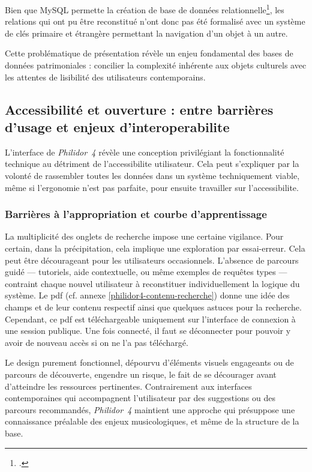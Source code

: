 Bien que MySQL permette la création de base de données relationnelle\footcite{duboisMySQLGuideOfficiel2004}, les relations qui ont pu être reconstitué n'ont donc pas été formalisé avec un système de clés primaire et étrangère permettant la navigation d'un objet à un autre.

Cette problématique de présentation révèle un enjeu fondamental des bases de données patrimoniales : concilier la complexité inhérente aux objets culturels avec les attentes de lisibilité des utilisateurs contemporains.

\subsection{Accessibilité et ouverture : entre barrières d'usage et enjeux d'\gls{interoperabilite}} \label{accessibilite_et_ouverture}

L'interface de \textit{Philidor~4} révèle une conception privilégiant la fonctionnalité technique au détriment de l'\gls{accessibilite} utilisateur. Cela peut s'expliquer par la volonté de rassembler toutes les données dans un système techniquement viable, même si l'ergonomie n'est pas parfaite, pour ensuite travailler sur l'\gls{accessibilite}.

\subsubsection{Barrières à l'appropriation et courbe d'apprentissage}

La multiplicité des onglets de recherche impose une certaine vigilance. Pour certain, dans la précipitation, cela implique une exploration par essai-erreur. Cela peut être décourageant pour les utilisateurs occasionnels. L'absence de parcours guidé --- tutoriels, aide contextuelle, ou même exemples de requêtes types --- contraint chaque nouvel utilisateur à reconstituer individuellement la logique du système. Le \gls{pdf}  (cf. annexe \ref{philidor4-contenu-recherche}) donne une idée des champs et de leur contenu respectif ainsi que quelques astuces pour la recherche. Cependant, ce \gls{pdf} est téléchargeable uniquement sur l'interface de connexion à une session publique. Une fois connecté, il faut se déconnecter pour pouvoir y avoir de nouveau accès si on ne l'a pas téléchargé.

Le design purement fonctionnel, dépourvu d'éléments visuels engageants ou de parcours de découverte, engendre un risque, le fait de se décourager avant d'atteindre les ressources pertinentes. Contrairement aux interfaces contemporaines qui accompagnent l'utilisateur par des suggestions ou des parcours recommandés, \textit{Philidor~4} maintient une approche  qui présuppose une connaissance préalable des enjeux musicologiques, et même de la structure de la base. 


